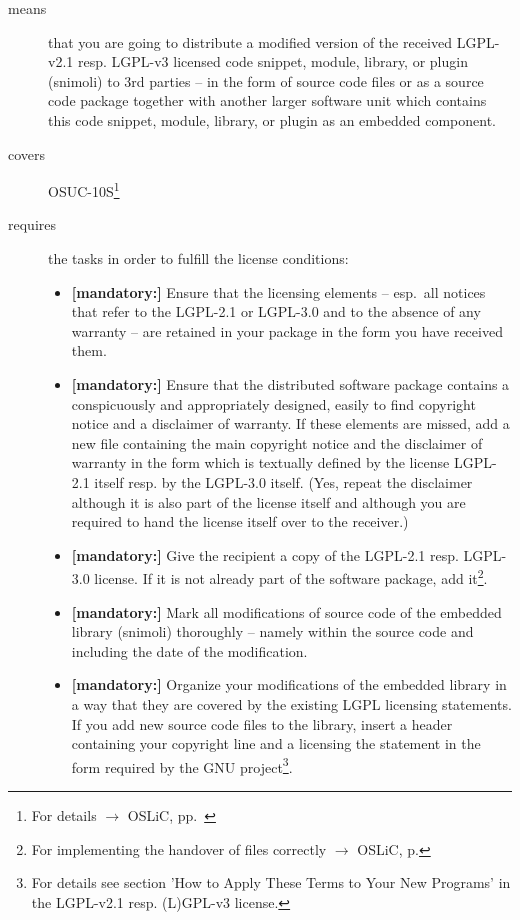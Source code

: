 \begin{description}
\item[means] that you are going to distribute a modified version of the received
LGPL-v2.1 resp. LGPL-v3 licensed code snippet, module, library, or plugin
(snimoli) to 3rd parties -- in the form of source code files or as a source code
package together with another larger software unit which contains this code
snippet, module, library, or plugin as an embedded component.
\item[covers] OSUC-10S\footnote{For details $\rightarrow$ OSLiC, pp.\
\pageref{OSUC-10S-DEF}}
\item[requires] the tasks in order to fulfill the license conditions:
\begin{itemize}


  \item \textbf{[mandatory:]} Ensure that the licensing elements -- esp.\ all
  notices that refer to the LGPL-2.1 or LGPL-3.0 and to the absence of any
  warranty -- are retained in your package in the form you have received them.

  \item \textbf{[mandatory:]} Ensure that the distributed software package
  contains a conspicuously and appropriately designed, easily to find copyright
  notice and a disclaimer of warranty. If these elements are missed, add a new
  file containing the main copyright notice and the disclaimer of warranty in the
  form which is textually defined by the license LGPL-2.1 itself resp. by the
  LGPL-3.0 itself. (Yes, repeat the disclaimer although it is also part of the
  license itself and although you are required to hand the license itself over
  to the receiver.)
  
  \item \textbf{[mandatory:]} Give the recipient a copy of the LGPL-2.1 resp.
  LGPL-3.0 license. If it is not already part of the software package, add
  it\footnote{For implementing the handover of files correctly $\rightarrow$
  OSLiC, p. \pageref{DistributingFilesHint}}.
    
  \item \textbf{[mandatory:]} Mark all modifications of source code of the
  embedded library (snimoli) thoroughly -- namely within the source code and
  including the date of the modification.
  
  \item \textbf{[mandatory:]} Organize your modifications of the embedded
  library in a way that they are covered by the existing LGPL licensing
  statements. If you add new source code files to the library, insert a header
  containing your copyright line and a licensing the statement in the form
  required by the GNU project\footnote{For details see section 'How to Apply
  These Terms to Your New Programs' in the LGPL-v2.1 resp. (L)GPL-v3 license.}.


\end{itemize}
\end{description}
